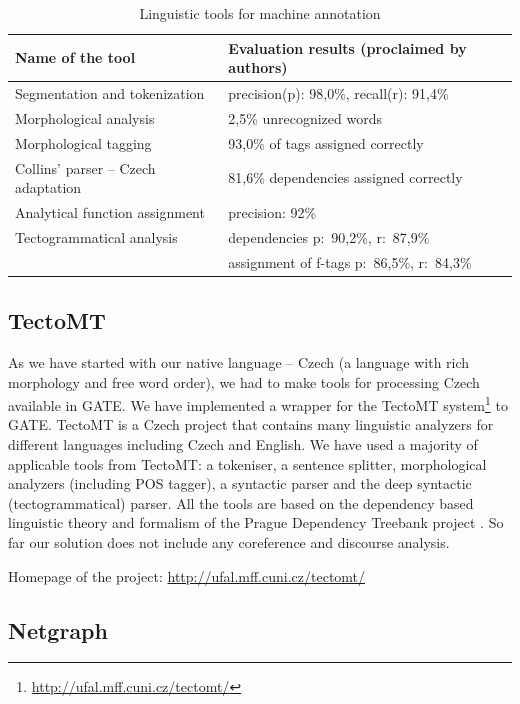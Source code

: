 \begin{table}
\centering
	\begin{tabular}{l|l}
		Name of the tool & Evaluation results (proclaimed by authors) \\[4pt]
		\hline
	Segmentation and tokenization & precision(p): 98,0\%, recall(r): 91,4\% \\[4pt]
	Morphological analysis & 2,5\% unrecognized words\\
	Morphological tagging & 93,0\% of tags assigned correctly \\[4pt]
	Collins' parser -- Czech adaptation & 81,6\% dependencies assigned correctly\\
	Analytical function assignment & precision: 92\% \\[4pt]
	Tectogrammatical analysis & dependencies p:~90,2\%, r:~87,9\%\\
	& assignment of f-tags p:~86,5\%, r:~84,3\%\\
	\end{tabular}
\caption{Linguistic tools for machine annotation}
\label{tab:ling_tools}
\end{table}


\subsection{TectoMT}
As we have started with our native language -- Czech (a language with rich morphology and free word order), we had to make tools for processing Czech available in GATE. We have implemented a wrapper for the TectoMT system\footnote{\url{http://ufal.mff.cuni.cz/tectomt/}} \citep{biblio:ZaPtTectoMTHighly2008} to GATE. TectoMT is a Czech project that contains many linguistic analyzers for different languages including Czech and English. We have used a majority of applicable tools from TectoMT: a tokeniser, a sentence splitter, morphological analyzers (including POS tagger), a syntactic parser and the deep syntactic (tectogrammatical) parser. All the tools are based on the dependency based linguistic theory and formalism of the Prague Dependency Treebank project \citep{biblio:PDT20_CD}. So far our solution does not include any coreference and discourse analysis.

Homepage of the project: \url{http://ufal.mff.cuni.cz/tectomt/}


\subsection{Netgraph} \label{sec:ch30_netgraph}

